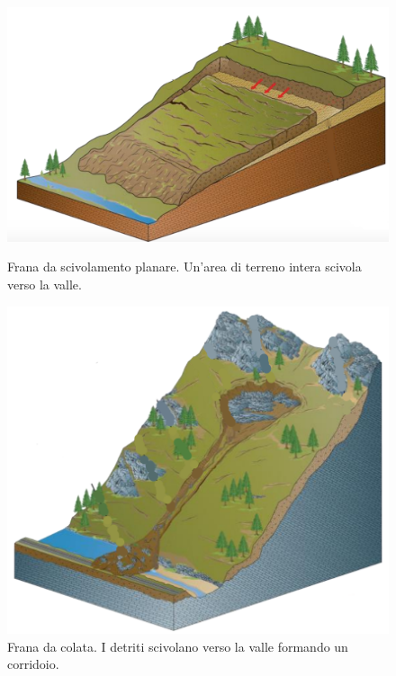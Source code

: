 \begin{figure}[h]
	\hspace{0.1\linewidth}
	\begin{minipage}[t]{0.35\linewidth}
		\centering
		\includegraphics[width=\textwidth]{images/Scivolamento_planare}
		\caption{Frana da scivolamento planare. Un'area di terreno intera scivola verso la valle.}
		\label{scivolamento}
	\end{minipage}
	\hspace{0.1\linewidth}
	\begin{minipage}[t]{0.35\linewidth}
		\centering
		\includegraphics[width=\textwidth]{images/colata}
		\caption{Frana da colata. I detriti scivolano verso la valle formando un corridoio. }
		\label{colata}
	\end{minipage}
\end{figure}

